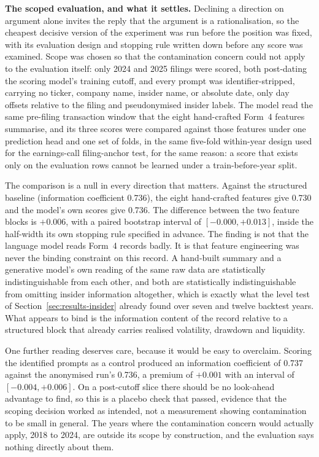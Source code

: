 \documentclass[logo,msc,ai]{infthesis}        %
\begin{document}
\textbf{The scoped evaluation, and what it settles.} Declining a direction on argument alone invites the reply that the argument is a rationalisation, so the cheapest decisive version of the experiment was run before the position was fixed, with its evaluation design and stopping rule written down before any score was examined. Scope was chosen so that the contamination concern could not apply to the evaluation itself: only 2024 and 2025 filings were scored, both post-dating the scoring model's training cutoff, and every prompt was identifier-stripped, carrying no ticker, company name, insider name, or absolute date, only day offsets relative to the filing and pseudonymised insider labels. The model read the same pre-filing transaction window that the eight hand-crafted Form~4 features summarise, and its three scores were compared against those features under one prediction head and one set of folds, in the same five-fold within-year design used for the earnings-call filing-anchor test, for the same reason: a score that exists only on the evaluation rows cannot be learned under a train-before-year split.

The comparison is a null in every direction that matters. Against the structured baseline (information coefficient 0.736), the eight hand-crafted features give 0.730 and the model's own scores give 0.736. The difference between the two feature blocks is $+0.006$, with a paired bootstrap interval of $[-0.000, +0.013]$, inside the half-width its own stopping rule specified in advance. The finding is not that the language model reads Form~4 records badly. It is that feature engineering was never the binding constraint on this record. A hand-built summary and a generative model's own reading of the same raw data are statistically indistinguishable from each other, and both are statistically indistinguishable from omitting insider information altogether, which is exactly what the level test of Section~\ref{sec:results-insider} already found over seven and twelve backtest years. What appears to bind is the information content of the record relative to a structured block that already carries realised volatility, drawdown and liquidity.

One further reading deserves care, because it would be easy to overclaim. Scoring the identified prompts as a control produced an information coefficient of 0.737 against the anonymised run's 0.736, a premium of $+0.001$ with an interval of $[-0.004, +0.006]$. On a post-cutoff slice there should be no look-ahead advantage to find, so this is a placebo check that passed, evidence that the scoping decision worked as intended, not a measurement showing contamination to be small in general. The years where the contamination concern would actually apply, 2018 to 2024, are outside its scope by construction, and the evaluation says nothing directly about them.
\end{document}
